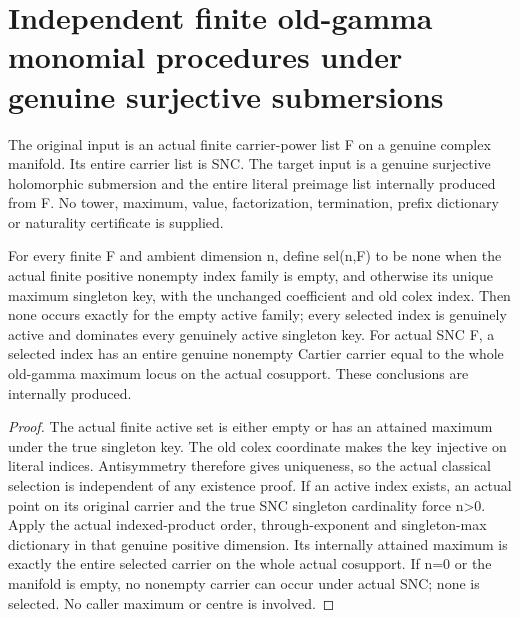 \section{Independent finite old-gamma monomial procedures under genuine surjective submersions}

The original input is an actual finite carrier-power list F on a genuine
complex manifold. Its entire carrier list is SNC. The target input is a
genuine surjective holomorphic submersion and the entire literal preimage
list internally produced from F. No tower, maximum, value, factorization,
termination, prefix dictionary or naturality certificate is supplied.

\begin{lemma}
\label{hir:submersion-ordered-procedure-selected-index}
\leanok
For every finite F and ambient dimension n, define sel(n,F) to be none when
the actual finite positive nonempty index family is empty, and otherwise
its unique maximum singleton key, with the unchanged coefficient and old
colex index. Then none occurs exactly for the empty active family; every
selected index is genuinely active and dominates every genuinely active
singleton key. For actual SNC F, a selected index has an entire genuine
nonempty Cartier carrier equal to the whole old-gamma maximum locus on the
actual cosupport. These conclusions are internally produced.
\end{lemma}
\begin{proof}
The actual finite active set is either empty or has an attained maximum
under the true singleton key. The old colex coordinate makes the key
injective on literal indices. Antisymmetry therefore gives uniqueness,
so the actual classical selection is independent of any existence proof.
If an active index exists, an actual point on its original carrier and the
true SNC singleton cardinality force n>0. Apply the actual indexed-product
order, through-exponent and singleton-max dictionary in that genuine
positive dimension. Its internally attained maximum is exactly the entire
selected carrier on the whole actual cosupport. If n=0 or the manifold is
empty, no nonempty carrier can occur under actual SNC; none is selected.
No caller maximum or centre is involved.
\end{proof}

